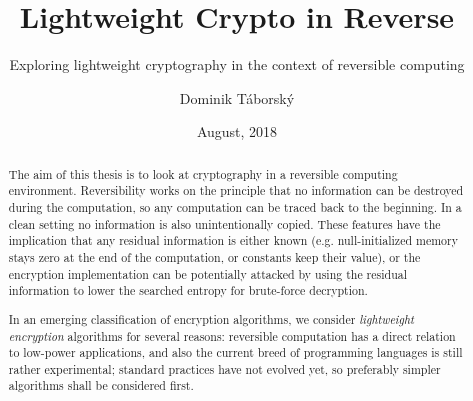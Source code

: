 \documentclass[a4paper,10pt,openright]{memoir}
\makeatletter
\newcommand{\verbatimfont}[1]{\def\verbatim@font{#1}}%
\makeatother
\begin{document}
\hypersetup{pageanchor=false}
\verbatimfont{\ttfamily\small}%

\thesiscomment{} %
\title{Lightweight Crypto in Reverse}
\subtitle{Exploring lightweight cryptography in the context of reversible computing}
\author{Dominik T\'{a}borsk\'{y}}
\date{August, 2018} %

\pagestyle{plain}
\maketitle

\hypersetup{pageanchor=true}
\cleardoublepage
{}
\setcounter{page}{3}

\cleardoublepage
\pagestyle{plain}
\begin{abstract}

The aim of this thesis is to look at cryptography in a reversible 
computing environment. Reversibility works on the principle that no 
information can be destroyed during the computation, so any computation 
can be traced back to the beginning. In a clean setting no information 
is also unintentionally copied. These features have the implication 
that any residual information is either known (e.g. null-initialized 
memory stays zero at the end of the computation, or constants keep 
their value), or the encryption implementation can be potentially 
attacked by using the residual information to lower the searched 
entropy for brute-force decryption.

In an emerging classification of encryption algorithms, we 
consider \textit{lightweight encryption} algorithms for several 
reasons: reversible computation has a direct relation to low-power 
applications, and also the current breed of programming languages is 
still rather experimental; standard practices have not evolved yet, so 
preferably simpler algorithms shall be considered first.

\end{abstract}

\end{document}

